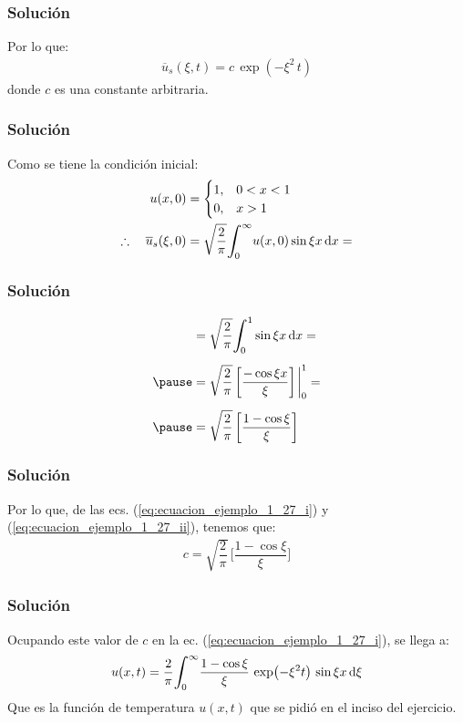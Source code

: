 \begin{frame}
\frametitle{Solución}
Por lo que:
\pause
\begin{align}
\overline{u}_{s} (\xi, t) = c \, \exp(-\xi^{2} \, t)
\label{eq:ecuacion_ejemplo_1_27_i}
\end{align}
donde $c$ es una constante arbitraria.
\end{frame}
\begin{frame}
\frametitle{Solución}
Como se tiene la condición inicial:
\pause
\begin{eqnarray*}
\begin{aligned}
u (x, 0) &= \begin{cases}
1, & 0 < x < 1  \\
0, & x > 1
\end{cases}
\\
\therefore \quad \overline{u}_{s} (\xi, 0) &= \sqrt{\dfrac{2}{\pi}} \scaleint{6ex}_{\bs 0}^{\infty} u (x, 0) \sin \xi x \dd{x}=
\end{aligned}
\end{eqnarray*}
\end{frame}
\begin{frame}
\frametitle{Solución}
\begin{eqnarray}
\begin{aligned}[b]
&= \sqrt{\dfrac{2}{\pi}} \scaleint{6ex}_{\bs 0}^{1} \sin \xi x \dd{x} = \\[0.5em] \pause 
&= \sqrt{\dfrac{2}{\pi}} \, \bigg[ \dfrac{- \cos \xi x}{\xi} \bigg] \eval_{0}^{1} = \\[0.5em] \pause
&= \sqrt{\dfrac{2}{\pi}} \, \bigg[ \dfrac{1 - \cos \xi}{\xi} \bigg]
\end{aligned}
\label{eq:ecuacion_ejemplo_1_27_ii}
\end{eqnarray}
\end{frame}
\begin{frame}
\frametitle{Solución}
Por lo que, de las ecs. (\ref{eq:ecuacion_ejemplo_1_27_i}) y (\ref{eq:ecuacion_ejemplo_1_27_ii}), tenemos que:
\pause
\begin{align*}
c = \sqrt{\dfrac{2}{\pi}} \, \bigg[ \dfrac{1 - \cos \xi}{\xi} \bigg]
\end{align*}
\end{frame}
\begin{frame}
\frametitle{Solución}  
Ocupando este valor de $c$ en la ec. (\ref{eq:ecuacion_ejemplo_1_27_i}), se llega a:
\pause
\begin{align*}
u (x, t) = \dfrac{2}{\pi} \scaleint{6ex}_{\bs 0}^{\infty} \dfrac{1 - \cos \xi}{\xi} \, \exp(-\xi^{2} t) \, \sin \xi x\dd{\xi}
\end{align*}
\pause
Que es la función de temperatura $u (x, t)$ que se pidió en el inciso del ejercicio.
\end{frame}
